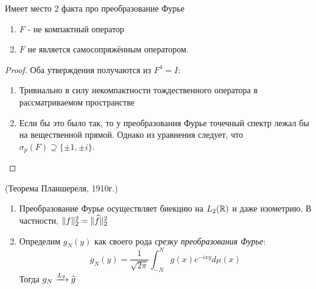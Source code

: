 \begin{corollary}
	Имеет место 2 факта про преобразование Фурье
	\begin{enumerate}
		\item $F$ - не компактный оператор
		
		\item $F$ не является самосопряжённым оператором.
	\end{enumerate}
\end{corollary}

\begin{proof}
	Оба утверждения получаются из $F^4 = I$:
	\begin{enumerate}
		\item Тривиально в силу некомпактности тождественного оператора в рассматриваемом пространстве
		
		\item Если бы это было так, то у преобразования Фурье точечный спектр лежал бы на вещественной прямой. Однако из уравнения следует, что $\sigma_p(F) \supseteq \{\pm 1, \pm i\}$.
	\end{enumerate}
\end{proof}

\begin{proposition} (Теорема Планшереля, 1910г.)
	\begin{enumerate}
		\item Преобразование Фурье осуществляет биекцию на $L_2(\mathbb{R})$ и даже изометрию. В частности, $\|f\|_2^2 = \|\widehat{f}\|_2^2$
		
		\item Определим $g_N(y)$ как своего рода \textit{срезку преобразования Фурье}:
		\[
			g_N(y) = \frac{1}{\sqrt{2\pi}} \int_{-N}^N g(x)e^{-ixy}d\mu(x)
		\]
		Тогда $g_N \xrightarrow[]{L_2} \widehat{g}$
	\end{enumerate}
\end{proposition}

